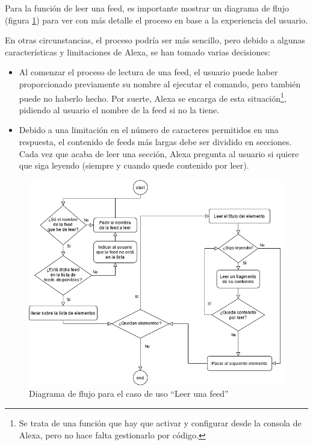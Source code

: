 \documentclass[11pt,spanish,listoffigures,listoftables,table,hyphens,dvipsnames]{tfgetsinf}
\begin{document}
Para la función de leer una feed, es importante mostrar un diagrama de flujo (figura \ref{figura:diagrama-flujo}) para ver con más detalle el proceso en base a la experiencia del usuario.

En otras circunstancias, el proceso podría ser más sencillo, pero debido a algunas características y limitaciones de Alexa, se han tomado varias decisiones:

\begin{itemize}
   \item Al comenzar el proceso de lectura de una feed, el usuario puede haber proporcionado previamente su nombre al ejecutar el comando, pero también puede no haberlo hecho. Por suerte, Alexa se encarga de esta situación\footnote{Se trata de una función que hay que activar y configurar desde la consola de Alexa, pero no hace falta gestionarlo por código.}, pidiendo al usuario el nombre de la feed si no la tiene.
   \item Debido a una limitación en el número de caracteres permitidos en una respuesta, el contenido de feeds más largas debe ser dividido en secciones. Cada vez que acaba de leer una sección, Alexa pregunta al usuario si quiere que siga leyendo (siempre y cuando quede contenido por leer).
\end{itemize}

\begin{figure}[ht]
   \centering
   \includegraphics[width=\textwidth]{diagrama-flujo.png}
   \caption{Diagrama de flujo para el caso de uso ``Leer una feed''}
   \label{figura:diagrama-flujo}
\end{figure}
\end{document}
